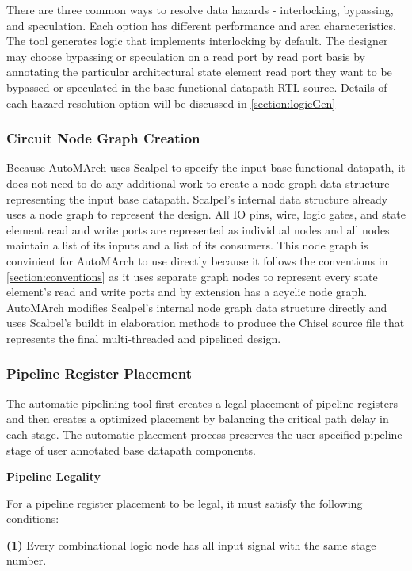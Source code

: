 There are three common ways to resolve data hazards - interlocking, bypassing, and speculation. Each option has different performance and area characteristics. The tool generates logic that implements interlocking by default. The designer may choose bypassing or speculation on a read port by read port basis by annotating the particular architectural state element read port they want to be bypassed or speculated in the base functional datapath RTL source. Details of each hazard resolution option will be discussed in \ref{section:logicGen}

\subsubsection{Circuit Node Graph Creation}
Because AutoMArch uses Scalpel to specify the input base functional datapath, it does not need to do any additional work to create a node graph data structure representing the input base datapath. Scalpel's internal data structure already uses a node graph to represent the design. All IO pins, wire, logic gates, and state element read and write ports are represented as individual nodes and all nodes maintain a list of its inputs and a list of its consumers. This node graph is convinient for AutoMArch to use directly because it follows the conventions in \ref{section:conventions} as it uses separate graph nodes to represent every state element's read and write ports and by extension has a acyclic node graph. AutoMArch modifies Scalpel's internal node graph data structure directly and uses Scalpel's buildt in elaboration methods to produce the Chisel source file that represents the final multi-threaded and pipelined design.

\subsubsection{Pipeline Register Placement}
The automatic pipelining tool first creates a legal placement of pipeline registers and then creates a optimized placement by balancing the critical path delay in each stage. The automatic placement process preserves the user specified pipeline stage of user annotated base datapath components.


{\bf Pipeline Legality}

For a pipeline register placement to be legal, it must satisfy the following conditions:

{\bf (1)} Every combinational logic node has all input signal with the same stage number.  

